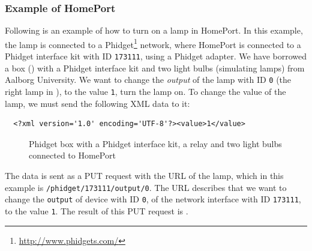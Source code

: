 \FloatBarrier
\subsubsection{Example of HomePort}
Following is an example of how to turn on a lamp in HomePort.
In this example, the lamp is connected to a Phidget\footnote{\url{http://www.phidgets.com/}} network, 
where HomePort is connected to a Phidget interface kit with ID \texttt{173111}, 
using a Phidget adapter. 
We have borrowed a box () with a Phidget interface kit and two light bulbs (simulating lamps) from Aalborg University.
We want to change the \emph{output} of the lamp with ID \texttt{0} (the right lamp in ),
to the value \texttt{1}, \ie turn the lamp on. 
To change the value of the lamp, 
we must send the following XML data to it:

\begin{verbatim}
  <?xml version='1.0' encoding='UTF-8'?><value>1</value>
\end{verbatim}

\begin{figure}[!htb]
	\centering
	\hfill
	\caption{Phidget box with a Phidget interface kit, a relay and two light bulbs connected to HomePort}
	\label{fig:phidget-box}
\end{figure}

The data is sent as a PUT request with the URL of the lamp, 
which in this example is \texttt{/phidget/173111/output/0}. 
The URL describes that we want to change the \texttt{output} of device with ID \texttt{0}, 
of the network interface with ID \texttt{173111}, to the value \texttt{1}.
The result of this PUT request is .


